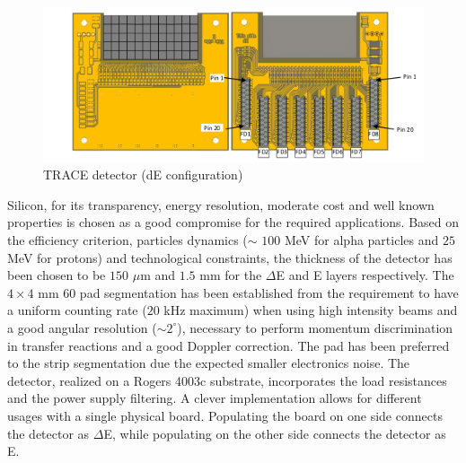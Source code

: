 \begin{figure}[h]
  \centering
  \includegraphics[scale=.65]{img/trace_de.png}
  \caption{TRACE detector (dE configuration)}
  \label{chain}
\end{figure}

\bigbreak

Silicon, for its transparency, energy resolution, moderate cost and
well known properties is chosen as a good compromise for the required
applications. Based on the efficiency criterion, particles dynamics ($\sim$
$100$ MeV for alpha particles and $25$ MeV for protons) and technological
constraints, the thickness of the detector has been chosen to be $150$ $\mu$m
and $1.5$ mm for the $\Delta$E and E layers respectively. The $4 \times 4$ mm
60 pad segmentation has been established from the requirement to have a uniform
counting rate ($20$ kHz maximum) when using high intensity beams and a good
angular resolution ($\sim 2^\circ$), necessary to perform momentum
discrimination in transfer reactions and a good Doppler correction. The pad
has been preferred to the strip segmentation due the expected smaller
electronics noise. The detector, realized on a Rogers 4003c substrate,
incorporates the load resistances and the power supply filtering. A clever
implementation allows for different usages with a single physical board.
Populating the board on one side connects the detector as $\Delta$E, while
populating on the other side connects the detector as E.
